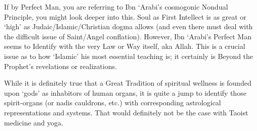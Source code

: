 \begin{footnotesize}
\begin{sffamily}
If by Perfect Man, you are referring to Ibn `Arabi's cosmogonic Nondual Principle, you might look deeper into this. Soul as First Intellect is as great or `high' as Judaic/Islamic/Christian dogma allows (and even there must deal with the difficult issue of Saint/Angel conflation). However, Ibn `Arabi's Perfect Man seems to Identify with the very Law or Way itself, aka Allah. This is a crucial issue as to how `Islamic' his most essential teaching is; it certainly is Beyond the Prophet's revelations or realizations.

While it is definitely true that a Great Tradition of spiritual wellness is founded upon `gods' as inhabitors of human organs, it is quite a jump to identify those spirit-organs (or nadis cauldrons, etc.) with corresponding astrological representations and systems. That would definitely not be the case with Taoist medicine and yoga.

\hfill

\end{sffamily}
\end{footnotesize}

